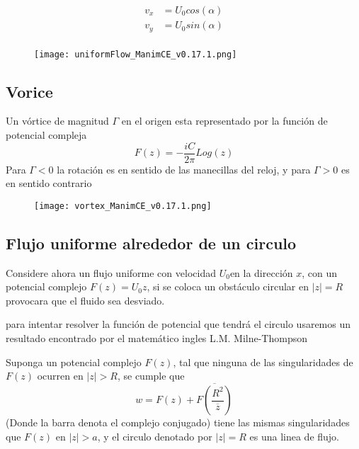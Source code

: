 \documentclass[12pt]{article}
\begin{document}
			\begin{equation}
				\begin{split}
				v_x &= U_0 cos(\alpha)\\
				v_y &= U_0 sin(\alpha)\\
				\end{split}
			\end{equation}
			\begin{figure}[!h]
				\begin{small}
					\begin{center}
						\texttt{[image: uniformFlow\_ManimCE\_v0.17.1.png]}
					\end{center}
					\caption{}
					\label{fig:}
				\end{small}
			\end{figure}
			

		\subsection{Vorice}
			Un vórtice de magnitud $\Gamma $ en el origen esta representado por la función de potencial compleja
			\begin{equation}
				F(z)= -\frac{iC}{2 \pi} Log(z)
			\end{equation}
			Para $\Gamma<0$ la rotación es en sentido de las manecillas del reloj, y para $\Gamma>0$ es en sentido contrario
			\begin{figure}[!h]
				\begin{small}
					\begin{center}
						\texttt{[image: vortex\_ManimCE\_v0.17.1.png]}
					\end{center}
					\caption{}
					\label{fig:}
				\end{small}
			\end{figure}
			

		\subsection{Flujo uniforme alrededor de un circulo }
		Considere ahora un flujo uniforme con velocidad $U_0$en la dirección $x$, con un potencial complejo $F(z)= U_0 z$, si se coloca un obstáculo circular en $|z| =R$ provocara que el fluido sea desviado.
		
		para intentar resolver la función de potencial que tendrá el circulo usaremos un resultado encontrado por el matemático ingles L.M. Milne-Thompson 
		\begin{theorem}
			Suponga un potencial complejo $F(z)$, tal que ninguna de las singularidades de $F(z)$ ocurren en $|z|>R$, se cumple que
			\begin{equation}
				w = F(z) + \overline{F \left( \frac{R^2}{\overline{z} }\right)} 
				\label{Teorema_del_circulo}
			\end{equation}
			(Donde la barra denota el complejo conjugado) tiene las mismas singularidades que $F(z)$ en $|z|>a $, y el circulo denotado por $|z|= R $ es una linea de flujo.
		\end{theorem}
		
\end{document}
